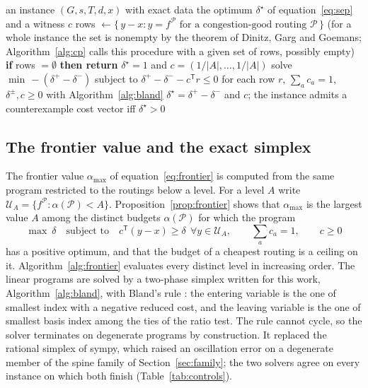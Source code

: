 \documentclass[11pt]{article}
\theoremstyle{remark}
\newcommand{\flow}{f}
\begin{document}
\begin{algorithm}[t]
\caption{Separation program: does any nonnegative cost vector make the instance a counterexample, and what is the largest normalised gap?}
\label{alg:sep}
\begin{algorithmic}[1]
\Require an instance $(G,s,T,d,x)$ with exact data
\Ensure the optimum $\delta^\star$ of equation~\eqref{eq:sep} and a witness $c$
\State rows $\gets\{\,y-x\colon y=\flow^{\mathcal P}\text{ for a congestion-good routing }\mathcal P\,\}$ (for a whole instance the set is nonempty by the theorem of Dinitz, Garg and Goemans; Algorithm~\ref{alg:cp} calls this procedure with a given set of rows, possibly empty)
\State \textbf{if} rows $=\emptyset$ \textbf{then return} $\delta^\star=1$ and $c=(1/|A|,\dots,1/|A|)$ 
\State solve $\min\,-(\delta^+-\delta^-)$ subject to $\delta^+-\delta^--c^{\mathsf T}r\le0$ for each row $r$, $\sum_ac_a=1$, $\delta^\pm,c\ge0$ with Algorithm~\ref{alg:bland}
\State \Return $\delta^\star=\delta^+-\delta^-$ and $c$; the instance admits a counterexample cost vector iff $\delta^\star>0$
\end{algorithmic}
\end{algorithm}

\subsection{The frontier value and the exact simplex}
\label{sec:frontier}

The frontier value $\alpha_{\max}$ of equation~\eqref{eq:frontier} is computed from the same program restricted to the routings below a level. For a level
$A$ write $\mathcal U_A=\{\flow^{\mathcal P}\colon\alpha(\mathcal P)<A\}$. Proposition~\ref{prop:frontier} shows that $\alpha_{\max}$ is the largest value $A$
among the distinct budgets $\alpha(\mathcal P)$ for which the program
\begin{equation}
\max\ \delta\quad\text{subject to}\quad c^{\mathsf T}(y-x)\ge\delta\ \ \forall y\in\mathcal U_A,\qquad\textstyle\sum_ac_a=1,\qquad c\ge0
\label{eq:levellp}
\end{equation}
has a positive optimum, and that the budget of a cheapest routing is a ceiling on it. Algorithm~\ref{alg:frontier} evaluates every distinct level in
increasing order. The linear programs are solved by a two-phase simplex written for this work, Algorithm~\ref{alg:bland}, with Bland's rule \cite{Bla77}: the entering
variable is the one of smallest index with a negative reduced cost, and the leaving variable is the one of smallest basis index among the ties of the
ratio test. The rule cannot cycle, so the solver terminates on degenerate programs by construction. It replaced the rational simplex of sympy, which raised
an oscillation error on a degenerate member of the spine family of Section~\ref{sec:family}; the two solvers agree on every instance on which both finish
(Table~\ref{tab:controls}).
\end{document}

